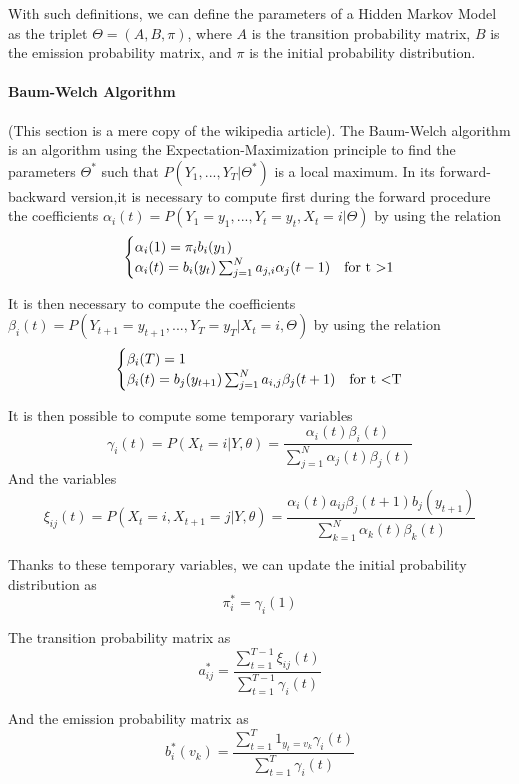 With such definitions, we can define the parameters of a Hidden Markov Model as the triplet $\Theta = (A, B, \pi)$, where $A$ is the transition probability matrix, $B$ is the emission probability matrix, and $\pi$ is the initial probability distribution.
\paragraph{Baum-Welch Algorithm}
(This section is a mere copy of the wikipedia article).
The Baum-Welch algorithm is an algorithm using the Expectation-Maximization principle to find the parameters $\Theta^*$ such that $P(Y_1,...,Y_T| \Theta^* )$ is a local maximum.
In its forward-backward version,it is necessary to compute first during the forward procedure the coefficients $\alpha_i(t) = P(Y_1=y_1,...,Y_t = y_t, X_t = i | \Theta )$ by using the relation
\begin{equation}
\begin{cases}
\alpha_i(1) = \pi_i b_i(y_1) & \\
\alpha_i(t) = b_i(y_t)\sum_{j=1}^{N}{a_{j,i}\alpha_j(t-1)} & \text{for t \textgreater 1}
\end{cases}
\end{equation}

It is then necessary to compute the coefficients $\beta_i(t) = P(Y_{t+1}=y_{t+1},...,Y_T = y_T| X_t = i, \Theta )$ by using the relation
\begin{equation}
\begin{cases}
\beta_i(T) = 1 & \\
\beta_i(t) = b_j(y_{t+1})\sum_{j=1}^{N}{a_{i,j}\beta_j(t+1)} & \text{for t \textless T}
\end{cases}
\end{equation}

It is then possible to compute some temporary variables
\[\gamma_i(t)=P(X_t=i|Y,\theta) = \frac{\alpha_i(t)\beta_i(t)}{\sum_{j=1}^N \alpha_j(t)\beta_j(t)}\]
And the variables
\[\xi_{ij}(t)=P(X_t=i,X_{t+1}=j|Y,\theta)=\frac{\alpha_i(t) a_{ij} \beta_j(t+1) b_j(y_{t+1})}{\sum_{k=1}^N \alpha_k(t)  \beta_k(t)}\]

Thanks to these temporary variables, we can update the initial probability distribution as
\[\pi_i^* = \gamma_i(1)\]

The transition probability matrix as
\[a_{ij}^*=\frac{\sum^{T-1}_{t=1}\xi_{ij}(t)}{\sum^{T-1}_{t=1}\gamma_i(t)}\]

And the emission probability matrix as
\[b_i^*(v_k)=\frac{\sum^T_{t=1} 1_{y_t=v_k} \gamma_i(t)}{\sum^T_{t=1} \gamma_i(t)}\]

